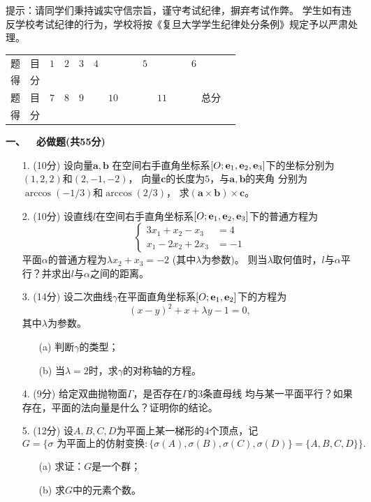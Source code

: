 \qquad 提示：请同学们秉持诚实守信宗旨，谨守考试纪律，摒弃考试作弊。
学生如有违反学校考试纪律的行为，学校将按《复旦大学学生纪律处分条例》规定予以严肃处理。

\begin{table}
\begin{tabular}{|c|c|c|c|}
题\ \ 目 &\quad$1$\quad&\quad$2$\quad&\quad$3$\quad&\quad$4$\quad&\quad$5$\quad&\quad$6$\quad\\
得\ \ 分 & & & & & & \\
题\ \ 目 &\quad$7$\quad&\quad$8$\quad&\quad$9$\quad&\ \ \ $10$\ \ \ &\ \ \ $11$\ \ \ &\ \ 总分\ \ \\
得\ \ 分 & & & & & & 
\end{tabular}
\end{table}

\textbf{一、\ \ 必做题(共55分)}
\begin{itemize}
    \item[1.] (10分) 设向量$\mathbf{a},\mathbf{b}$
    在空间右手直角坐标系$[O;\mathbf{e}_1,\mathbf{e}_2,\mathbf{e}_3]$下的坐标分别为$(1,2,2)$和$(2,-1,-2)$，
    向量$\mathbf{c}$的长度为$5$，与$\mathbf{a},\mathbf{b}$的夹角
    分别为$\arccos(-1/3)$和$\arccos(2/3)$，
    求$(\mathbf{a}\times\mathbf{b})\times\mathbf{c}$。
    \item[2.] (10分) 设直线$l$在空间右手直角坐标系$[O;\mathbf{e}_1,\mathbf{e}_2,\mathbf{e}_3]$下的普通方程为
    \begin{equation*}\left\{\begin{aligned}
        3x_1+x_2-x_3&=4\\x_1-2x_2+2x_3&=-1
    \end{aligned}\right.\end{equation*}
    平面$\alpha$的普通方程为$\lambda x_2+x_3=-2$ (其中$\lambda$为参数)。
    则当$\lambda$取何值时，$l$与$\alpha$平行？并求出$l$与$\alpha$之间的距离。
    \item[3.] (14分) 设二次曲线$\gamma$在平面直角坐标系$[O;\mathbf{e}_1,\mathbf{e}_2]$下的方程为
    \[(x-y)^2+x+\lambda y-1=0,\]
    其中$\lambda$为参数。
    \begin{itemize}
        \item[(a)] 判断$\gamma$的类型；
        \item[(b)] 当$\lambda=2$时，求$\gamma$的对称轴的方程。
    \end{itemize}
    \item[4.] (9分) 给定双曲抛物面$\Gamma$，是否存在$\Gamma$的$3$条直母线
    均与某一平面平行？如果存在，平面的法向量是什么？证明你的结论。
    \item[5.] (12分) 设$A,B,C,D$为平面上某一梯形的$4$个顶点，记
    \[G=\{\sigma\text{ 为平面上的仿射变换}:
    \{\sigma(A),\sigma(B),\sigma(C),\sigma(D)\}=\{A,B,C,D\}\}.\]
    \begin{itemize}
        \item[(a)] 求证：$G$是一个群；
        \item[(b)] 求$G$中的元素个数。
    \end{itemize}
\end{itemize}
